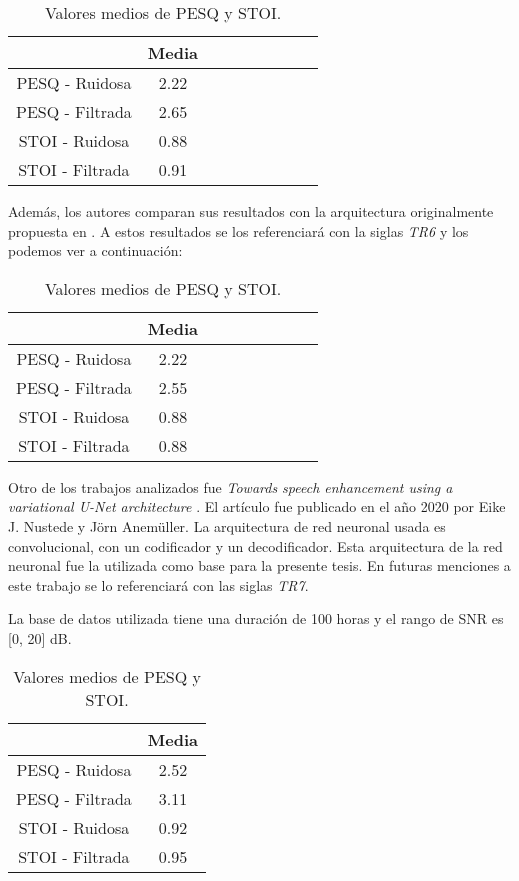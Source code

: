 \begin{table}[H]
	\centering
	\begin{tabular}{ |c|c|c|c|c|c|c|c|c| } 
		\hline
		 & Media \\ 
		\hline
		PESQ - Ruidosa & 2.22 \\
		PESQ - Filtrada & 2.65 \\
		\hline
		STOI - Ruidosa & 0.88 \\
		STOI - Filtrada & 0.91 \\
		\hline
	\end{tabular}
	\caption{Valores medios de PESQ y STOI.}
\end{table}

Además, los autores comparan sus resultados con la arquitectura originalmente propuesta en \cite{a_scalable_noisy_speech_dataset_and_online_subjective_test_framework}. A estos resultados se los referenciará con la siglas \emph{TR6} y los podemos ver a continuación:

\begin{table}[H]
	\centering
	\begin{tabular}{ |c|c|c|c|c|c|c|c|c| } 
		\hline
		& Media \\ 
		\hline
		PESQ - Ruidosa & 2.22 \\
		PESQ - Filtrada & 2.55 \\
		\hline
		STOI - Ruidosa & 0.88 \\
		STOI - Filtrada & 0.88 \\
		\hline
	\end{tabular}
	\caption{Valores medios de PESQ y STOI.}
\end{table}

Otro de los trabajos analizados fue \emph{Towards speech enhancement using a variational U-Net architecture} \cite{towards_speech_enhancement_using_a_variational_U-Net_architecture}. El artículo fue publicado en el año 2020 por Eike J. Nustede y Jörn Anemüller. La arquitectura de red neuronal usada es convolucional, con un codificador y un decodificador. Esta arquitectura de la red neuronal fue la utilizada como base para la presente tesis. En futuras menciones a este trabajo se lo referenciará con las siglas \emph{TR7}.

La base de datos utilizada tiene una duración de 100 horas y el rango de SNR es [0, 20] dB.

\begin{table}[H]
	\centering
	\begin{tabular}{ |c|c| } 
		\hline
		 & Media \\ 
		\hline
		PESQ - Ruidosa & 2.52 \\
		PESQ - Filtrada & 3.11 \\
		\hline
		STOI - Ruidosa & 0.92 \\
		STOI - Filtrada & 0.95 \\
		\hline
	\end{tabular}
	\caption{Valores medios de PESQ y STOI.}
\end{table}

